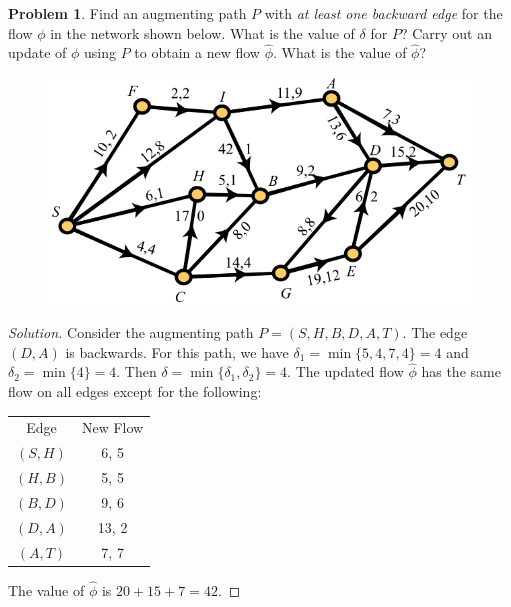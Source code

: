 \documentclass[12pt]{article}
\newcounter{chapternumber}
\theoremstyle{definition}
\newtheorem{problem-internal}{Problem}[chapternumber]
\newenvironment{problem}{
  \medskip
  \begin{problem-internal}
}{
\end{problem-internal}
}
\newenvironment{solution}{
  \begin{proof}[Solution]
    \vspace{-8px}
    \setlength{\parskip}{4px}
    \setlength{\parindent}{0px}
}{
\end{proof}
}
\begin{document}
  \begin{problem}
    Find an augmenting path \(P\) with \textit{at least one backward edge} for the flow \(\phi\) in the network shown below. What is the value of \(\delta\) for \(P\)? Carry out an update of \(\phi\) using \(P\) to obtain a new flow \(\hat{\phi}\). What is the value of \(\hat{\phi}\)?

    \begin{figure}[H]
      \centering
      \includegraphics[scale=0.5]{media/aug_path.png}
    \end{figure}

  \end{problem}

  \begin{solution}
    Consider the augmenting path \(P = (S, H, B, D, A, T)\). The edge \((D, A)\) is backwards. For this path, we have \(\delta_{1} = \min \{5, 4, 7, 4\} = 4\) and \(\delta_{2} = \min \{4\} = 4\). Then \(\delta = \min \{\delta_{1}, \delta_{2}\} = 4\). The updated flow \(\hat{\phi}\) has the same flow on all edges except for the following:

    \begin{center}
      \begin{tabular}{c c}
        Edge & New Flow \\
        \((S, H)\) & 6, 5 \\
        \((H, B)\) & 5, 5 \\
        \((B, D)\) & 9, 6 \\
        \((D, A)\) & 13, 2 \\
        \((A, T)\) & 7, 7
      \end{tabular}
    \end{center}

    The value of \(\hat{\phi}\) is \(20 + 15 + 7 = 42\).
  \end{solution}
\end{document}
